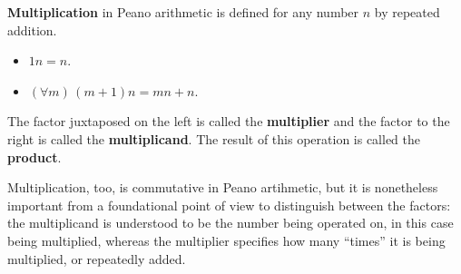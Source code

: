 \documentclass[letterpaper]{article}
\begin{document}
\begin{definition}
	\textbf{Multiplication} in Peano arithmetic is defined for any number $n$ by repeated addition.
	\begin{itemize}
		\item $1n=n$.
		\item $(\forall m)\,(m+1)n=mn+n$.
	\end{itemize}
	The factor juxtaposed on the left is called the \textbf{multiplier} and the factor to the right is called the \textbf{multiplicand}.  The result of this operation is called the \textbf{product}.
\end{definition}
\begin{remark}	
	Multiplication, too, is commutative in Peano artihmetic, but it is nonetheless important from a foundational point of view to distinguish between the factors: the multiplicand is understood to be the number being operated on, in this case being multiplied, whereas the multiplier specifies how many ``times'' it is being multiplied, or repeatedly added.
\end{remark}
\end{document}
